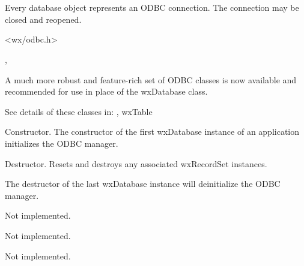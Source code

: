 \section{}\label{wxdatabase}

Every database object represents an ODBC connection.
The connection may be closed and reopened.




<wx/odbc.h>


, 

A much more robust and feature-rich set of ODBC classes is now
available and recommended for use in place of the wxDatabase class.

See details of these classes in:
, wxTable




Constructor. The constructor of the first wxDatabase instance of an
application initializes the ODBC manager.



Destructor. Resets and destroys any associated wxRecordSet instances.

The destructor of the last wxDatabase instance will deinitialize
the ODBC manager.



Not implemented.



Not implemented.



Not implemented.



